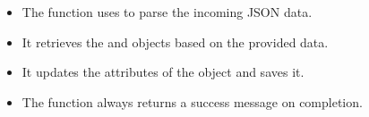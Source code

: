 \documentclass[letterpaper,10pt,english]{sphinxmanual}
\begin{document}
\begin{fulllineitems}
\begin{description}
\begin{itemize}
\item {} 
\sphinxAtStartPar
The function uses  to parse the incoming JSON data.

\item {} 
\sphinxAtStartPar
It retrieves the  and  objects based on the provided data.

\item {} 
\sphinxAtStartPar
It updates the attributes of the  object and saves it.

\item {} 
\sphinxAtStartPar
The function always returns a success message on completion.

\end{itemize}

\end{description}

\end{fulllineitems}

\end{document}
